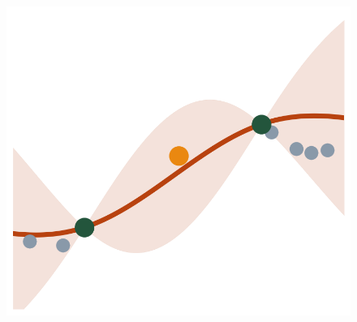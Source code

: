 \documentclass{beamer}                             %
\begin{document}
\begin{frame}
\begin{columns}
\begin{column}{0.4\textwidth}
{       {
        \begin{figure}
          \centering
          \includegraphics[width=\textwidth]{graphs/predict_cknn_2}
        \end{figure}
      }
    }

  \end{column}
\end{columns}

\end{frame}
\end{document}
